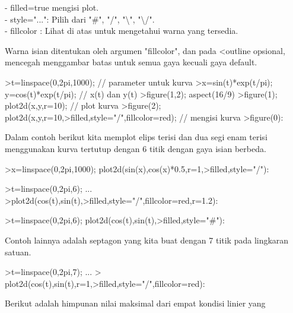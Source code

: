 \begin{eulernotebook}
\begin{eulercomment}
- filled=true mengisi plot.\\
- style="...": Pilih dari "#", "/", "\textbackslash{}", "\textbackslash{}/".\\
- fillcolor : Lihat di atas untuk mengetahui warna yang tersedia.

Warna isian ditentukan oleh argumen "fillcolor", dan pada \textless{}outline
opsional, mencegah menggambar batas untuk semua gaya kecuali gaya
default.
\end{eulercomment}
\begin{eulerprompt}
>t=linspace(0,2pi,1000); // parameter untuk kurva
>x=sin(t)*exp(t/pi); y=cos(t)*exp(t/pi); // x(t) dan y(t)
>figure(1,2); aspect(16/9)
>figure(1); plot2d(x,y,r=10); // plot kurva
>figure(2); plot2d(x,y,r=10,>filled,style="/",fillcolor=red); // mengisi kurva
>figure(0):
\end{eulerprompt}
\begin{eulercomment}
Dalam contoh berikut kita memplot elips terisi dan dua segi enam
terisi menggunakan kurva tertutup dengan 6 titik dengan gaya isian
berbeda.
\end{eulercomment}
\begin{eulerprompt}
>x=linspace(0,2pi,1000); plot2d(sin(x),cos(x)*0.5,r=1,>filled,style="/"):
\end{eulerprompt}
\begin{eulerprompt}
>t=linspace(0,2pi,6); ...
>plot2d(cos(t),sin(t),>filled,style="/",fillcolor=red,r=1.2):
\end{eulerprompt}
\begin{eulerprompt}
>t=linspace(0,2pi,6); plot2d(cos(t),sin(t),>filled,style="#"):
\end{eulerprompt}
\begin{eulercomment}
Contoh lainnya adalah septagon yang kita buat dengan 7 titik pada
lingkaran satuan.
\end{eulercomment}
\begin{eulerprompt}
>t=linspace(0,2pi,7);  ...
> plot2d(cos(t),sin(t),r=1,>filled,style="/",fillcolor=red):
\end{eulerprompt}
\begin{eulercomment}
Berikut adalah himpunan nilai maksimal dari empat kondisi linier yang

\end{eulercomment}
\end{eulernotebook}
